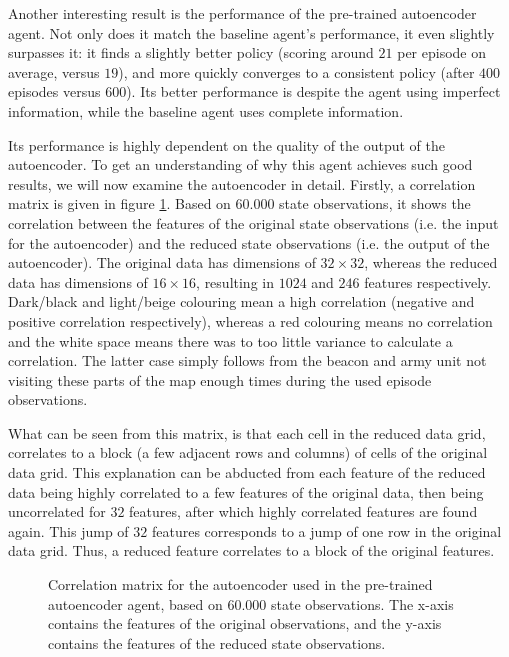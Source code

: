 Another interesting result is the performance of the pre-trained autoencoder agent. Not only does it match the baseline agent's performance, it even slightly surpasses it: it finds a slightly better policy (scoring around $21$ per episode on average, versus $19$), and more quickly converges to a consistent policy (after $400$ episodes versus $600$). Its better performance is despite the agent using imperfect information, while the baseline agent uses complete information.

Its performance is highly dependent on the quality of the output of the autoencoder. To get an understanding of why this agent achieves such good results, we will now examine the autoencoder in detail. Firstly, a correlation matrix is given in figure \ref{fig:ae-corr}. Based on $60.000$ state observations, it shows the correlation between the features of the original state observations (i.e. the input for the autoencoder) and the reduced state observations (i.e. the output of the autoencoder). The original data has dimensions of $32 \times 32$, whereas the reduced data has dimensions of $16 \times 16$, resulting in $1024$ and $246$ features respectively. Dark/black and light/beige colouring mean a high correlation (negative and positive correlation respectively), whereas a red colouring means no correlation and the white space means there was to too little variance to calculate a correlation. The latter case simply follows from the beacon and army unit not visiting these parts of the map enough times during the used episode observations.

What can be seen from this matrix, is that each cell in the reduced data grid, correlates to a block (a few adjacent rows and columns) of cells of the original data grid. This explanation can be abducted from each feature of the reduced data being highly correlated to a few features of the original data, then being uncorrelated for $32$ features, after which highly correlated features are found again. This jump of $32$ features corresponds to a jump of one row in the original data grid. Thus, a reduced feature correlates to a block of the original features.

\begin{figure}
	\centering
	\caption{Correlation matrix for the autoencoder used in the pre-trained autoencoder agent, based on $60.000$ state observations. The x-axis contains the features of the original observations, and the y-axis contains the features of the reduced state observations.}
	\label{fig:ae-corr}
\end{figure}

